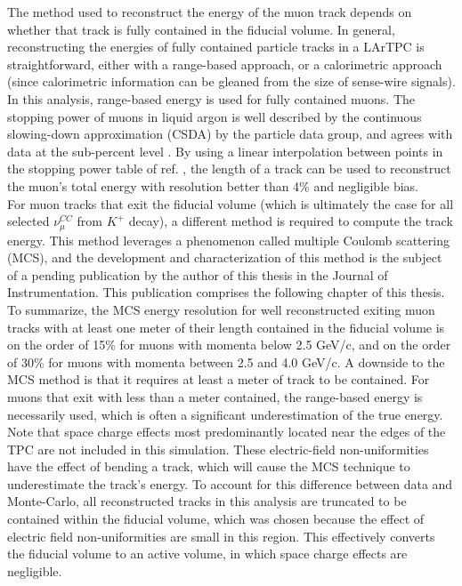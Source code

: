 The method used to reconstruct the energy of the muon track depends on whether that track is fully contained in the fiducial volume. In general, reconstructing the energies of fully contained particle tracks in a LArTPC is straightforward, either with a range-based approach, or a calorimetric approach (since calorimetric information can be gleaned from the size of sense-wire signals). In this analysis, range-based energy is used for fully contained muons. The stopping power of muons in liquid argon is well described by the continuous slowing-down approximation (CSDA) by the particle data group, and agrees with data at the sub-percent level \cite{MIPenergysource} \cite{PDG_spline_table}. By using a linear interpolation between points in the stopping power table of ref. \cite{PDG_spline_table}, the length of a track can be used to reconstruct the muon's total energy with resolution better than 4\% and negligible bias.\\

For muon tracks that exit the fiducial volume (which is ultimately the case for all selected $\nu_\mu^{CC}$ from $K^+$ decay), a different method is required to compute the track energy. This method leverages a phenomenon called multiple Coulomb scattering (MCS), and the development and characterization of this method is the subject of a pending publication by the author of this thesis in the Journal of Instrumentation. This publication comprises the following chapter of this thesis. To summarize, the MCS energy resolution for well reconstructed exiting muon tracks with at least one meter of their length contained in the fiducial volume is on the order of 15\% for muons with momenta below 2.5 GeV/c, and on the order of 30\% for muons with momenta between 2.5 and 4.0 GeV/c. A downside to the MCS method is that it requires at least a meter of track to be contained. For muons that exit with less than a meter contained, the range-based energy is necessarily used, which is often a significant underestimation of the true energy. Note that space charge effects most predominantly located near the edges of the TPC are not included in this simulation. These electric-field non-uniformities have the effect of bending a track, which will cause the MCS technique to underestimate the track's energy. To account for this difference between data and Monte-Carlo, all reconstructed tracks in this analysis are truncated to be contained within the fiducial volume, which was chosen because the effect of electric field non-uniformities are small in this region. This effectively converts the fiducial volume to an active volume, in which space charge effects are negligible.\\

